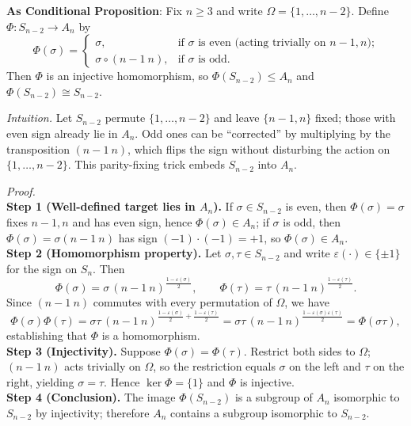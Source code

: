 \documentclass[12pt]{article}
\theoremstyle{definition}
\begin{document}
\noindent \textbf{As Conditional Proposition}: Fix $n\ge 3$ and write $\Omega=\{1,\dots,n-2\}$. Define $\Phi:S_{n-2}\to A_n$ by
\[
\Phi(\sigma)=
\begin{cases}
\sigma, & \text{if $\sigma$ is even (acting trivially on $n-1,n$);} \\
\sigma\circ(n-1\ n), & \text{if $\sigma$ is odd.}
\end{cases}
\]
Then $\Phi$ is an injective homomorphism, so $\Phi(S_{n-2})\le A_n$ and $\Phi(S_{n-2})\cong S_{n-2}$.\\

\newpage

\dotfill

\emph{Intuition.} Let $S_{n-2}$ permute $\{1,\dots,n-2\}$ and leave $\{n-1,n\}$ fixed; those with even sign already lie in $A_n$. Odd ones can be “corrected” by multiplying by the transposition $(n-1\ n)$, which flips the sign without disturbing the action on $\{1,\dots,n-2\}$. This parity-fixing trick embeds $S_{n-2}$ into $A_n$.\\

\dotfill

\emph{Proof.}\\
\textbf{Step 1 (Well-defined target lies in $A_n$).} If $\sigma\in S_{n-2}$ is even, then $\Phi(\sigma)=\sigma$ fixes $n-1,n$ and has even sign, hence $\Phi(\sigma)\in A_n$; if $\sigma$ is odd, then $\Phi(\sigma)=\sigma(n-1\ n)$ has sign $(-1)\cdot(-1)=+1$, so $\Phi(\sigma)\in A_n$.\\
\textbf{Step 2 (Homomorphism property).} Let $\sigma,\tau\in S_{n-2}$ and write $\varepsilon(\cdot)\in\{\pm1\}$ for the sign on $S_{n}$. Then
\[
\Phi(\sigma)=\sigma\,(n-1\ n)^{\frac{1-\varepsilon(\sigma)}{2}},\qquad
\Phi(\tau)=\tau\,(n-1\ n)^{\frac{1-\varepsilon(\tau)}{2}} .
\]
Since $(n-1\ n)$ commutes with every permutation of $\Omega$, we have
\[
\Phi(\sigma)\Phi(\tau)
=\sigma\tau\,(n-1\ n)^{\frac{1-\varepsilon(\sigma)}{2}+\frac{1-\varepsilon(\tau)}{2}}
=\sigma\tau\,(n-1\ n)^{\frac{1-\varepsilon(\sigma)\varepsilon(\tau)}{2}}
=\Phi(\sigma\tau),
\]
establishing that $\Phi$ is a homomorphism.\\
\textbf{Step 3 (Injectivity).} Suppose $\Phi(\sigma)=\Phi(\tau)$. Restrict both sides to $\Omega$; $(n-1\ n)$ acts trivially on $\Omega$, so the restriction equals $\sigma$ on the left and $\tau$ on the right, yielding $\sigma=\tau$. Hence $\ker\Phi=\{1\}$ and $\Phi$ is injective.\\
\textbf{Step 4 (Conclusion).} The image $\Phi(S_{n-2})$ is a subgroup of $A_n$ isomorphic to $S_{n-2}$ by injectivity; therefore $A_n$ contains a subgroup isomorphic to $S_{n-2}$.\\

\newpage
\end{document}
